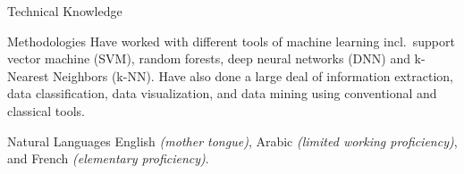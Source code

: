 \documentclass[10pt,a4paper]{article}
\begin{document}


\nocite{Latent2012}
\nocite{DCSI2012}
\nocite{Ref2013}
\nocite{Lisbon2015}
\nocite{Pylogeny}
\nocite{Thesis} %
\printbibliography[heading=none]

\spacedhrule{0.5em}{-0.4em} %



\inlineheadsection
{Technical Knowledge}
{\hspace{24pt} }

\inlineheadsection 
{Methodologies}
{Have worked with different tools of machine learning incl.\ support vector machine (SVM), random forests, deep neural networks (DNN) and k-Nearest Neighbors (k-NN). Have also done a large deal of information extraction, data classification, data visualization, and data mining using conventional and classical tools.}

\inlineheadsection 
{Natural Languages}
{English \textit{(mother tongue)}, Arabic \textit{(limited working proficiency)}, and French \textit{(elementary proficiency)}.}

\end{document}
